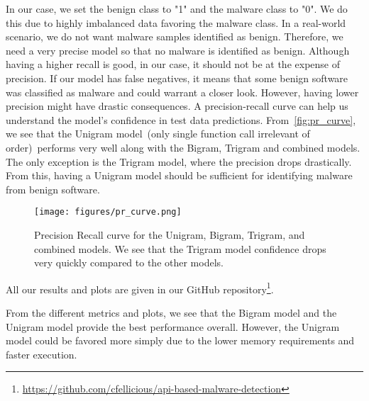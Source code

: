 In our case, we set the benign class to "1" and the malware class to "0". 
We do this due to highly imbalanced data favoring the malware class. 
In a real-world scenario, we do not want malware samples identified as benign.
Therefore, we need a very precise model so that no malware is identified as benign.
Although having a higher recall is good, in our case, it should not be at the expense of precision.
If our model has false negatives, it means that some benign software was classified as malware and could warrant a closer look.
However, having lower precision might have drastic consequences.
A precision-recall curve can help us understand the model's confidence in test data predictions. 
From~\autoref{fig:pr_curve}, we see that the Unigram model~(only single function call irrelevant of order)~performs very well along with the Bigram, Trigram and combined models.
The only exception is the Trigram model, where the precision drops drastically. 
From this, having a Unigram model should be sufficient for identifying malware from benign software. 
\begin{figure}
    \centering
    \texttt{[image: figures/pr\_curve.png]}
    \caption{Precision Recall curve for the Unigram, Bigram, Trigram, and combined models. We see that the Trigram model confidence drops very quickly compared to the other models.}
    \label{fig:pr_curve}
\end{figure}
All our results and plots are given in our GitHub repository\footnote{\url{https://github.com/cfellicious/api-based-malware-detection}}.

\iffalse
We also take a look at the~ROC Curve in~\autoref{fig:tpr}~which gives us an idea of the rate of the predictions of true positives to false positives by a model. 
We see that the trigram-based model performs worse than the other models. 
The AUC values in~\autoref{tab:metrics}~also point to the trigram model being the worst.
\begin{figure}[h]
    \centering
    \texttt{[image: figures/tpr.png]}
    \caption{ROC curve for the unigram, bigram, trigram and combined models. We see that the trigram model performance drops when compared to the other models. AUC values are 0.9843, 0.9881, 0.9495, and 0.9812 for the unigram, bigram, trigram, and combined models respectively.}
    \label{fig:tpr}
\end{figure}
\fi
From the different metrics and plots, we see that the Bigram model and the Unigram model provide the best performance overall. However, the Unigram model could be favored more simply due to the lower memory requirements and faster execution. 

